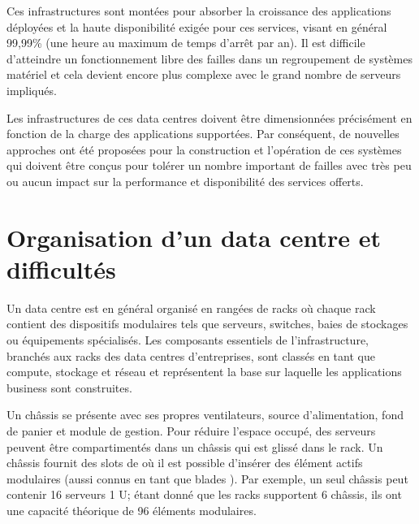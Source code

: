 Ces infrastructures sont montées pour absorber la croissance des applications déployées et la haute disponibilité exigée pour ces services, visant en général 99,99\% (une heure au maximum de temps d'arrêt par an). Il est difficile d'atteindre un fonctionnement libre des failles dans un regroupement de systèmes matériel et cela devient encore plus complexe avec le grand nombre de serveurs impliqués.

\par
Les infrastructures de ces data centres doivent être dimensionnées précisément  en fonction de la charge des applications supportées. Par conséquent, de nouvelles approches ont été proposées pour la construction et l'opération de ces systèmes qui doivent être conçus pour tolérer un nombre important de failles avec très peu ou aucun impact sur la performance et disponibilité des services offerts. \cite{understandingCloudWhatDC}  \cite{datacenterAsComputerIntro}

\section{Organisation d'un data centre et difficultés}

Un data centre est en général organisé en rangées de racks où chaque rack contient des dispositifs modulaires tels que serveurs, switches, baies de stockages ou équipements spécialisés. %
Les composants essentiels de l'infrastructure, branchés aux racks des data centres d'entreprises, sont classés en tant que compute, stockage et réseau et représentent la base sur laquelle les applications business sont construites. 

Un châssis se présente avec ses propres ventilateurs, source d'alimentation, fond de panier et module de gestion. 
Pour réduire l'espace occupé, des serveurs peuvent être compartimentés dans un châssis qui est glissé dans le rack. Un châssis fournit des slots de %
où il est possible d'insérer des élément actifs modulaires (aussi connus en tant que \og blades \fg{}). Par exemple, un seul châssis peut contenir 16 serveurs 1 U; étant donné que les racks supportent 6 châssis, ils ont une capacité théorique de 96 éléments modulaires.


